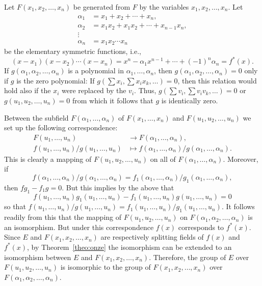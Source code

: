 \documentclass[10pt,leqno]{article}
\theoremstyle{definition}
\begin{document}
Let $F(x_1, x_2, \ldots, x_n)$ be generated from $F$ by the variables $x_1, x_2, \ldots, x_n$.
Let 
\begin{align*}
\alpha_1 &= x_1 + x_2 + \cdots + x_n,
\\
\alpha_2 &= x_1 x_2 + x_1 x_2 + \cdots + x_{n-1} x_n,
\\
\vdots &
\\
\alpha_n &= x_1 x_2 \cdots x_n
\end{align*}
be the elementary symmetric functions, i.e., 
\[
(x - x_1) (x - x_2) \cdots (x - x_n) 
= x^n - \alpha_1 x^{n-1} + \cdots + (-1)^n \alpha_n = f^*(x).
\]
If $g(\alpha_1, \alpha_2, \ldots, \alpha_n)$ is a polynomial in $\alpha_1, \ldots, \alpha_n$, then $g(\alpha_1, \alpha_2, \ldots, \alpha_n) = 0$ only if $g$ is the zero polynomial:
If $g(\sum x_i, \sum x_i x_k, \ldots ) = 0$, then this relation would hold also if the $x_i$ were replaced by the $v_i$.
Thus, $g(\sum v_i, \sum v_i v_k, \ldots) = 0$ or $g(u_1, u_2, \ldots, u_n) = 0$ from which it follows that $g$ is identically zero.


Between the subfield $F(\alpha_1, \ldots, \alpha_n)$ of $F(x_1, \ldots, x_n)$ and $F(u_1, u_2, \ldots, u_n)$ we set up the following correspondence:
\begin{align*}
F(u_1, \ldots, u_n) &\to F(\alpha_1, \ldots, \alpha_n),
\\
f(u_1, \ldots, u_n) / g(u_1, \ldots, u_n) 
&\mapsto f(\alpha_1, \ldots, \alpha_n) / g(\alpha_1, \ldots, \alpha_n).
\end{align*}
This is clearly a mapping of $F(u_1, u_2, \ldots, u_n)$ on all of $F(\alpha_1, \ldots, \alpha_n)$.
Moreover, if 
\[
f(\alpha_1, \ldots, \alpha_n) / g(\alpha_1, \ldots, \alpha_n) 
= f_1(\alpha_1, \ldots, \alpha_n) / g_1(\alpha_1, \ldots, \alpha_n),
\]
then $f g_1 - f_1 g = 0$.
But this implies by the above that
\[
f(u_1, \ldots, u_n) g_1(u_1, \ldots, u_n)
- f_1(u_1, \ldots, u_n) g(u_1, \ldots, u_n) = 0
\]
so that $f(u_1, \ldots, u_n) / g(u_1, \ldots, u_n) = f_1(u_1, \ldots, u_n) / g_1(u_1, \ldots, u_n)$.
It follows readily from this that the mapping of $F(u_1,u_2,\ldots,u_n)$ on $F(\alpha_1,\alpha_2,\ldots,\alpha_n)$ is an isomorphism.
But under this correspondence $f(x)$ corresponds to $f^*(x)$.
Since $E$ and $F(x_1,x_2,\ldots,x_n)$ are respectively splitting fields of $f(x)$ and $f^*(x)$, by Theorem~\ref{theo:onze} the isomorphism can be extended to an isomorphism between $E$ and $F(x_1,x_2,\ldots,x_n)$.
Therefore, the group of $E$ over $F(u_1,u_2,\ldots,u_n)$ is isomorphic to the group of $F(x_1,x_2,\ldots,x_n)$ over $F(\alpha_1,\alpha_2,\ldots,\alpha_n)$.
\end{document}
